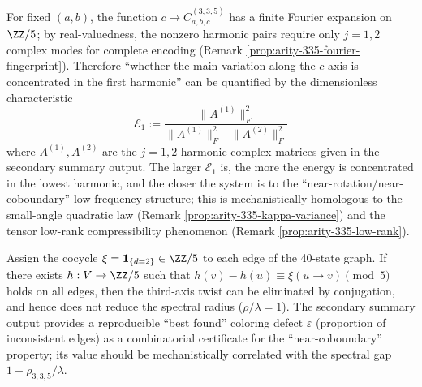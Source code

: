 

\begin{remark}\label{rem:arity-335-harmonic-energy}
For fixed \((a,b)\), the function \(c\mapsto C^{(3,3,5)}_{a,b,c}\) has a finite Fourier expansion on \(\ZZ/5\);
by real-valuedness, the nonzero harmonic pairs require only \(j=1,2\) complex modes for complete encoding (Remark \ref{prop:arity-335-fourier-fingerprint}).
Therefore ``whether the main variation along the \(c\) axis is concentrated in the first harmonic'' can be quantified by the dimensionless characteristic
$$
\mathcal{E}_1
:=\frac{\|A^{(1)}\|_F^2}{\|A^{(1)}\|_F^2+\|A^{(2)}\|_F^2}
$$
where \(A^{(1)},A^{(2)}\) are the \(j=1,2\) harmonic complex matrices given in the secondary summary output.
The larger \(\mathcal{E}_1\) is, the more the energy is concentrated in the lowest harmonic, and the closer the system is to the ``near-rotation/near-coboundary'' low-frequency structure; this is mechanistically homologous to the small-angle quadratic law (Remark \ref{prop:arity-335-kappa-variance}) and the tensor low-rank compressibility phenomenon (Remark \ref{prop:arity-335-low-rank}).
\end{remark}

\begin{remark}\label{rem:arity-335-best-5-coloring}
Assign the cocycle $\xi=\mathbf{1}_{\{d=2\}}\in\ZZ/5$ to each edge of the 40-state graph. If there exists $h:V\to\ZZ/5$ such that $h(v)-h(u)\equiv \xi(u\to v)\pmod 5$ holds on all edges, then the third-axis twist can be eliminated by conjugation, and hence does not reduce the spectral radius ($\rho/\lambda=1$). The secondary summary output provides a reproducible ``best found'' coloring defect $\varepsilon$ (proportion of inconsistent edges) as a combinatorial certificate for the ``near-coboundary'' property; its value should be mechanistically correlated with the spectral gap $1-\rho_{3,3,5}/\lambda$.
\end{remark}

